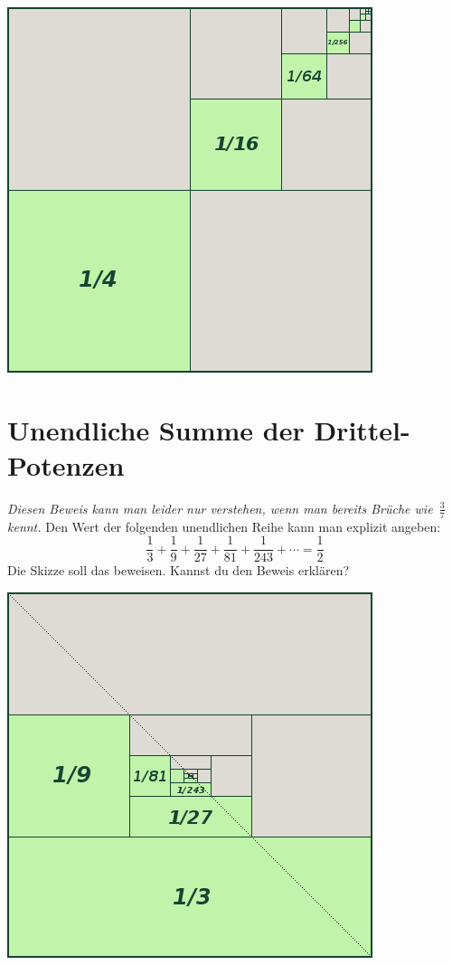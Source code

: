 \documentclass[a5paper,ngerman,landscape,11pt]{scrartcl}
\begin{document}
\vfill
\begin{center}
\includegraphics[scale=0.5]{geometrische-reihe-2}
\end{center}


\newpage
\section*{Unendliche Summe der Drittel-Potenzen}
\emph{Diesen Beweis kann man leider nur verstehen, wenn man bereits Brüche
wie~$\frac{3}{7}$ kennt.}
Den Wert der folgenden unendlichen Reihe kann man
explizit angeben:
\[ \frac{1}{3} + \frac{1}{9} + \frac{1}{27} +
\frac{1}{81} + \frac{1}{243} + \cdots = \frac{1}{2} \]
Die Skizze soll das beweisen. Kannst du den Beweis erklären?

\vfill
\begin{center}
\includegraphics[scale=0.5]{geometrische-reihe-3}
\end{center}
\end{document}

